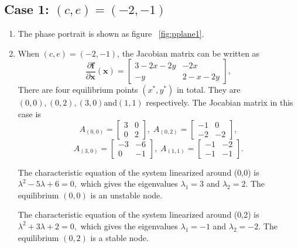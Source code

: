 \subsection*{Case 1: $(c,e)=(-2,-1)$}
\begin{enumerate}
\item The phase portrait is shown as figure ~\ref{fig:pplane1}.
\item When $(c,e)=(-2,-1)$, the Jacobian matrix can be written as
\begin{equation*}
    \frac{\partial\textbf{f}}{\partial \textbf{x}}(\textbf{x}) =
    \left[\begin{array}{cc}
    3-2x-2y & -2x \\
    -y & 2-x-2y
    \end{array}\right],
\end{equation*}
There are four equilibrium points $(x^*,y^*)$ in total. They are $(0,0),(0,2),(3,0)$and$(1,1)$ respectively. The Jocabian matrix in this case is
\begin{equation*}
    A_{(0,0)} =
    \left[\begin{array}{cc}
    3 & 0 \\
    0 & 2
    \end{array}\right], \; A_{(0,2)} =
    \left[\begin{array}{cc}
    -1 & 0 \\
    -2 & -2
    \end{array}\right],   
    \end{equation*}
    \begin{equation*}
    A_{(3,0)} =
    \left[\begin{array}{cc}
    -3 & -6 \\
    0 & -1
    \end{array}\right], \;A_{(1,1)} =
    \left[\begin{array}{cc}
    -1 & -2 \\
    -1 & -1
    \end{array}\right].
\end{equation*}

The characteristic equation of the system linearized around \mbox{(0,0)} is $\lambda^2 -5 \lambda + 6 = 0,$ which gives the eigenvalues $\lambda_{1} = 3$ and $\lambda_{2} = 2$. The equilibrium $(0,0)$ is an unstable node. 

The characteristic equation of the system linearized around \mbox{(0,2)} is $\lambda^2 +3 \lambda + 2 = 0,$ which gives the eigenvalues $\lambda_1 = -1$ and $\lambda_2 = -2$. The equilibrium $(0,2)$ is a stable node.
 

\end{enumerate}

